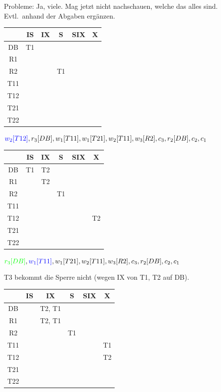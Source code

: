 \begin{note}
\begin{enumerate}[a)]
Probleme: Ja, viele. Mag jetzt nicht nachschauen, welche das alles sind. Evtl.\ anhand der Abgaben ergänzen.

\begin{tabular}{|c|c|c|c|c|c|}
	\hline
	& IS & IX & S & SIX & X \\
	\hline
	DB & T1 &  &  &  &  \\
	\hline
	R1 &  &  &  &  &  \\
	\hline
	R2 &  &  & T1 &  &  \\
	\hline
	T11 &  &  &  &  &  \\
	\hline
	T12 &  &  &  &  &  \\
	\hline
	T21 &  &  &  &  &  \\
	\hline
	T22 &  &  &  &  &  \\
	\hline
\end{tabular}

$\textcolor{blue}{w_2[T12]}, r_3[DB], w_1[T11], w_1[T21], w_2[T11], w_3[R2], c_3, r_2[DB], c_2, c_1$

\begin{tabular}{|c|c|c|c|c|c|}
	\hline
	& IS & IX & S & SIX & X \\
	\hline
	DB & T1 & T2 &  &  &  \\
	\hline
	R1 &  & T2 &  &  &  \\
	\hline
	R2 &  &  & T1 &  &  \\
	\hline
	T11 &  &  &  &  &  \\
	\hline
	T12 &  &  &  &  & T2 \\
	\hline
	T21 &  &  &  &  &  \\
	\hline
	T22 &  &  &  &  &  \\
	\hline
\end{tabular}

$\textcolor{green}{r_3[DB]}, \textcolor{blue}{w_1[T11]}, w_1[T21], w_2[T11], w_3[R2], c_3, r_2[DB], c_2, c_1$

T3 bekommt die Sperre nicht (wegen IX von T1, T2 auf DB).

\begin{tabular}{|c|c|c|c|c|c|}
	\hline
	& IS & IX & S & SIX & X \\
	\hline
	DB & & T2, T1 &  &  &  \\
	\hline
	R1 &  & T2, T1 &  &  &  \\
	\hline
	R2 &  &  & T1 &  &  \\
	\hline
	T11 &  &  &  &  & T1 \\
	\hline
	T12 &  &  &  &  & T2 \\
	\hline
	T21 &  &  &  &  &  \\
	\hline
	T22 &  &  &  &  &  \\
	\hline
\end{tabular}


\end{enumerate}
\end{note}
